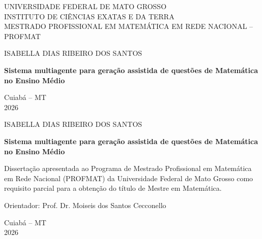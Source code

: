 
\begin{titlepage}
\centering
{\large UNIVERSIDADE FEDERAL DE MATO GROSSO\\
INSTITUTO DE CIÊNCIAS EXATAS E DA TERRA\\
MESTRADO PROFISSIONAL EM MATEMÁTICA EM REDE NACIONAL -- PROFMAT\par}
\vspace{3cm}
{\Large ISABELLA DIAS RIBEIRO DOS SANTOS\par}
\vfill
{\LARGE\bfseries Sistema multiagente para geração assistida de questões de Matemática no Ensino
Médio\par}
\vfill
{\large Cuiabá -- MT\\ 2026\par}
\end{titlepage}

\begin{titlepage}
\centering
{\Large ISABELLA DIAS RIBEIRO DOS SANTOS\par}
\vspace{4cm}
{\LARGE\bfseries Sistema multiagente para geração assistida de questões de Matemática no Ensino
Médio\par}
\vspace{3cm}
\hfill
\begin{minipage}{0.55\textwidth}
\small
Dissertação apresentada ao Programa de Mestrado Profissional em Matemática em Rede Nacional
(PROFMAT) da Universidade Federal de Mato Grosso como requisito parcial para a obtenção do título de
Mestre em Matemática.

\medskip
Orientador: Prof. Dr. Moiseis dos Santos Cecconello
\end{minipage}
\vfill
{\large Cuiabá -- MT\\ 2026\par}
\end{titlepage}
